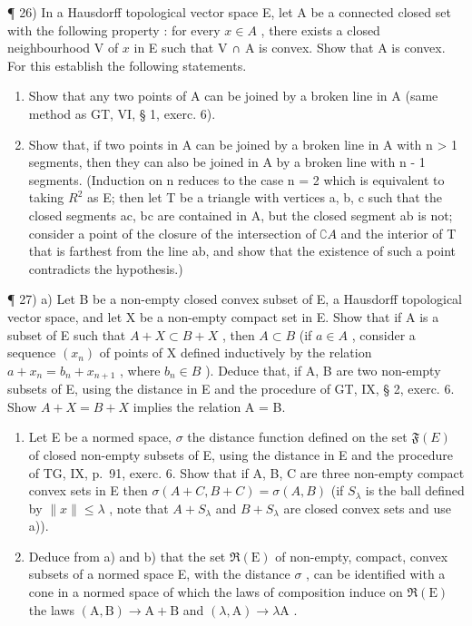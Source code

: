 ¶ 26) In a Hausdorff topological vector space E, let A be a connected closed set with the following property : for every \(x \in A\) , there exists a closed neighbourhood V of \(x\) in E such that V ∩ A is convex. Show that A is convex. For this establish the following statements.

\begin{enumerate}
\def\labelenumi{\alph{enumi})}
\item
  Show that any two points of A can be joined by a broken line in A (same method as GT, VI, § 1, exerc. 6).
\item
  Show that, if two points in A can be joined by a broken line in A with n > 1 segments, then they can also be joined in A by a broken line with n - 1 segments. (Induction on n reduces to the case n = 2 which is equivalent to taking \(R^{2}\) as E; then let T be a triangle with vertices a, b, c such that the closed segments ac, bc are contained in A, but the closed segment ab is not; consider a point of the closure of the intersection of \(\complement A\) and the interior of T that is farthest from the line ab, and show that the existence of such a point contradicts the hypothesis.)
\end{enumerate}

¶ 27) a) Let B be a non-empty closed convex subset of E, a Hausdorff topological vector space, and let X be a non-empty compact set in E. Show that if A is a subset of E such that \(A + X \subset B + X\) , then \(A \subset B\) (if \(a \in A\) , consider a sequence \((x_{n})\) of points of X defined inductively by the relation \(a + x_{n} = b_{n} + x_{n+1}\) , where \(b_{n} \in B\) ). Deduce that, if A, B are two non-empty subsets of E, using the distance in E and the procedure of GT, IX, § 2, exerc. 6. Show \(A + X = B + X\) implies the relation A = B.

\begin{enumerate}
\def\labelenumi{\alph{enumi})}
\setcounter{enumi}{1}
\item
  Let E be a normed space, \(\sigma\) the distance function defined on the set \(\mathfrak{F}(E)\) of closed non-empty subsets of E, using the distance in E and the procedure of TG, IX, p.~91, exerc. 6. Show that if A, B, C are three non-empty compact convex sets in E then \(\sigma(A+C, B+C)=\sigma(A, B)\) (if \(S_{\lambda}\) is the ball defined by \(\|x\|\leqslant\lambda\) , note that \(A+S_{\lambda}\) and \(B+S_{\lambda}\) are closed convex sets and use a)).
\item
  Deduce from a) and b) that the set \(\Re(\mathrm{E})\) of non-empty, compact, convex subsets of a normed space E, with the distance \(\sigma\) , can be identified with a cone in a normed space of which the laws of composition induce on \(\Re(\mathrm{E})\) the laws \((\mathrm{A}, \mathrm{B}) \to \mathrm{A} + \mathrm{B}\) and \((\lambda, \mathrm{A}) \to \lambda\mathrm{A}\) .
\end{enumerate}

